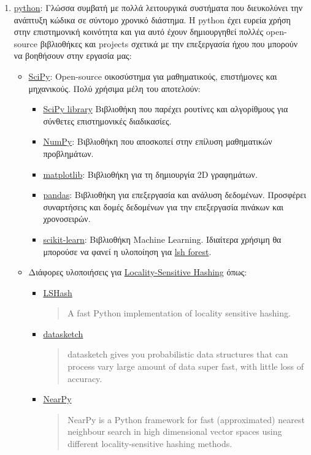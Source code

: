 \begin{enumerate}
	\item \href{https://www.python.org/}{python}:
	      Γλώσσα συμβατή με πολλά λειτουργικά συστήματα που διευκολύνει την ανάπτυξη κώδικα σε σύντομο χρονικό διάστημα.
	      Η python έχει ευρεία χρήση στην επιστημονική κοινότητα και για αυτό έχουν δημιουργηθεί πολλές open-source βιβλιοθήκες και projects σχετικά με την επεξεργασία ήχου που μπορούν να βοηθήσουν στην εργασία μας:
	      \begin{itemize}
	      	\item \href{https://www.scipy.org/}{SciPy}:
	      	      Open-source οικοσύστημα για μαθηματικούς, επιστήμονες και μηχανικούς.
	      	      Πολύ χρήσιμα μέλη του αποτελούν:
	      	      \begin{itemize}
	      	      	\item \href{https://www.scipy.org/scipylib/index.html}{SciPy library}
	      	      	      Βιβλιοθήκη που παρέχει ρουτίνες και αλγορίθμους για σύνθετες επιστημονικές διαδικασίες.
	      	      	\item \href{http://www.numpy.org/}{NumPy}:
	      	      	      Βιβλιοθήκη που αποσκοπεί στην επίλυση μαθηματικών προβλημάτων.
	      	      	\item \href{http://matplotlib.org/}{matplotlib}:
	      	      	      Βιβλιοθήκη για τη δημιουργία 2D γραφημάτων.
	      	      	\item \href{http://pandas.pydata.org/}{pandas}:
	      	      	      Βιβλιοθήκη για επεξεργασία και ανάλυση δεδομένων.
	      	      	      Προσφέρει συναρτήσεις και δομές δεδομένων για την επεξεργασία πινάκων και χρονοσειρών.
	      	      	\item \href{http://scikit-learn.org/stable/}{scikit-learn}:
	      	      	      Βιβλιοθήκη Machine Learning.
	      	      	      Ιδιαίτερα χρήσιμη θα μπορούσε να φανεί η υλοποίηση για \href{http://scikit-learn.org/stable/modules/generated/sklearn.neighbors.LSHForest.html#sklearn.neighbors.LSHForest}{lsh forest}.
	      	      \end{itemize}

	      	\item Διάφορες υλοποιήσεις για \hyperref[sub:lsh]{Locality-Sensitive Hashing} όπως:
	      	      \begin{itemize}
	      	      	\item \href{https://github.com/kayzhu/LSHash}{LSHash}
	      	      	      \blockquote{A fast Python implementation of locality sensitive hashing.}
	      	      	\item \href{https://github.com/ekzhu/datasketch}{datasketch}
	      	      	      \blockquote{datasketch gives you probabilistic data structures that can process vary large amount of data super fast, with little loss of accuracy.}
	      	      	\item \href{https://github.com/pixelogik/NearPy}{NearPy}
	      	      	      \blockquote{NearPy is a Python framework for fast (approximated) nearest neighbour search in high dimensional vector spaces using different locality-sensitive hashing methods.}
	      	      \end{itemize}


\end{itemize}
\end{enumerate}
